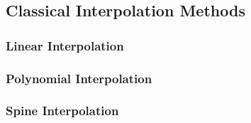 \subsection{Classical Interpolation Methods}
\label{sec:app:interp}
\subsubsection{Linear Interpolation}
\subsubsection{Polynomial Interpolation}
\subsubsection{Spine Interpolation}